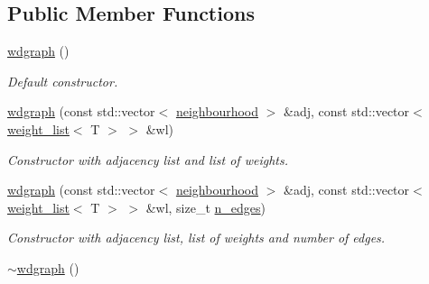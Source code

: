 \subsection*{Public Member Functions}
\begin{DoxyCompactItemize}
\item 
\hypertarget{classlgraph_1_1wdgraph_af381df59a5f5504670f157b06ecdcdea}{\hyperlink{classlgraph_1_1wdgraph_af381df59a5f5504670f157b06ecdcdea}{wdgraph} ()}\label{classlgraph_1_1wdgraph_af381df59a5f5504670f157b06ecdcdea}

\begin{DoxyCompactList}\small\item\em Default constructor. \end{DoxyCompactList}\item 
\hyperlink{classlgraph_1_1wdgraph_a80abe8c4fc1312f56e82a71d361b337f}{wdgraph} (const std\-::vector$<$ \hyperlink{namespacelgraph_a052e7766c13f3a43cec0aec8173fdede}{neighbourhood} $>$ \&adj, const std\-::vector$<$ \hyperlink{namespacelgraph_a1e0fd5ef0a78b2a92da48adbed265cb6}{weight\-\_\-list}$<$ T $>$ $>$ \&wl)
\begin{DoxyCompactList}\small\item\em Constructor with adjacency list and list of weights. \end{DoxyCompactList}\item 
\hyperlink{classlgraph_1_1wdgraph_ad76940eece0a10a99e684a8896ac2669}{wdgraph} (const std\-::vector$<$ \hyperlink{namespacelgraph_a052e7766c13f3a43cec0aec8173fdede}{neighbourhood} $>$ \&adj, const std\-::vector$<$ \hyperlink{namespacelgraph_a1e0fd5ef0a78b2a92da48adbed265cb6}{weight\-\_\-list}$<$ T $>$ $>$ \&wl, size\-\_\-t \hyperlink{classlgraph_1_1xxgraph_a8ca991d1521cb6ba77e1cd3494ab42be}{n\-\_\-edges})
\begin{DoxyCompactList}\small\item\em Constructor with adjacency list, list of weights and number of edges. \end{DoxyCompactList}\item 
\hypertarget{classlgraph_1_1wdgraph_a1364d5edcfdbec98623148777f9ff163}{\hyperlink{classlgraph_1_1wdgraph_a1364d5edcfdbec98623148777f9ff163}{$\sim$wdgraph} ()}\label{classlgraph_1_1wdgraph_a1364d5edcfdbec98623148777f9ff163}


\end{DoxyCompactItemize}
